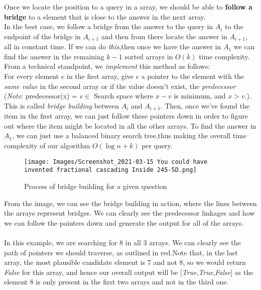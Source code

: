 \documentclass[11pt]{article}
\begin{document}
Once we locate the position to a query in a array, we should be able to \textbf{follow a bridge} to a element that is close to the answer in the next array. \\
In the best case, we follow a bridge from the answer to the query in $A_i$ to the endpoint of the bridge in $A_{i+1}$ and then from there locate the answer in $A_{i+1}$, all in constant time. If we can do \textit{this},then once we have the answer in $A_1$ we can find the answer in the remaining $k-1$ sorted arrays in $O(k)$ time complexity. \\

From a technical standpoint, we \textit{implement} this method as follows: \\
For every element $e$ in the first array, give $e$ a pointer to the element with the \textit{same value} in the second array or if the value doesn't exist, the \textit{predecessor} (\textit{Note}: predecessor(x) = $v \in $ Search space where $x-v$ is minimum, and $x>v$.). This is called \textit{bridge building} between $A_i$ and $A_{i+1}$. Then, once we've found the item in the first array, we can just follow these pointers down in order to figure out where the item might be located in all the other arrays. To find the answer in $A_1$, we can just use a balanced binary search tree,thus making the overall time complexity of our algorithm $O(\log n + k)$ per query.

\begin{figure}[H]
    \centering
    \texttt{[image: Images/Screenshot\_2021-03-15 You could have invented fractional cascading Inside 245-5D.png]}
    \caption{Process of bridge building for a given question}
    \label{fig:label}
\end{figure}

From the image, we can see the bridge building in action, where the lines between the arrays represent bridges. We can clearly see the predecessor linkages and how we can follow the pointers down and generate the output for all of the arrays. \\ \\ 
In this example, we are searching for 8 in all 3 arrays. We can clearly see the path of pointers we should traverse, as outlined in red.Note that, in the last array, the most plausible candidate element is 7 and not 8, so we would return \textit{False} for this array, and hence our overall output will be [\textit{True},\textit{True},\textit{False}] as the element 8 is only present in the first two arrays and not in the third one.
\end{document}
